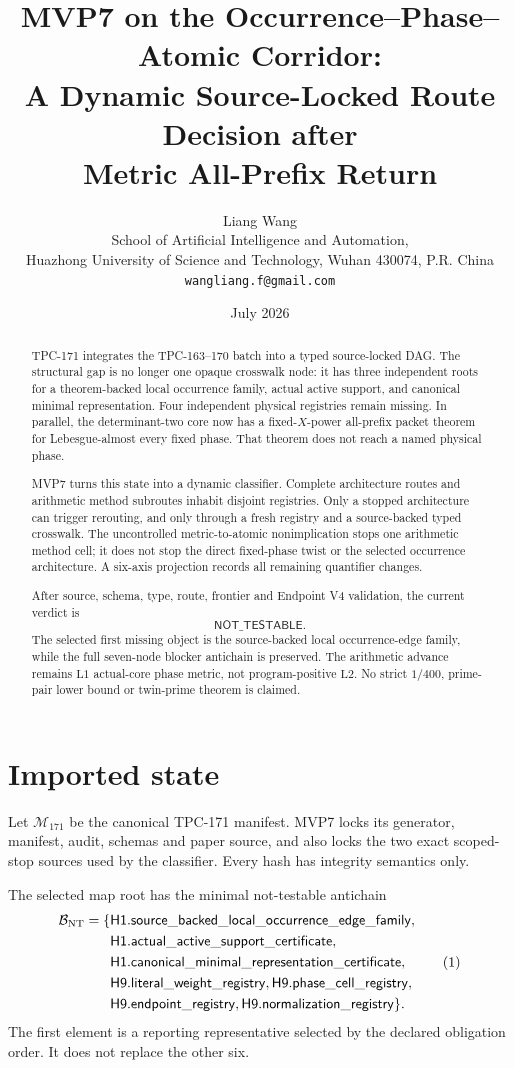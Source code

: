 \documentclass[11pt]{article}
\title{\textbf{MVP7 on the Occurrence--Phase--Atomic Corridor:}\\
\textbf{A Dynamic Source-Locked Route Decision after}\\
\textbf{Metric All-Prefix Return}}
\author{Liang Wang\\
School of Artificial Intelligence and Automation,\\
Huazhong University of Science and Technology, Wuhan 430074, P.R. China\\
\texttt{wangliang.f@gmail.com}}
\date{July 2026}
\theoremstyle{definition}
\theoremstyle{remark}
\newcommand{\Lone}{\mathrm{L1}}
\newcommand{\Ltwo}{\mathrm{L2}}
\begin{document}
\maketitle

\begin{abstract}
TPC-171 integrates the TPC-163--170 batch into a typed source-locked
DAG.  The structural gap is no longer one opaque crosswalk node: it
has three independent roots for a theorem-backed local occurrence
family, actual active support, and canonical minimal representation.
Four independent physical registries remain missing.  In parallel,
the determinant-two core now has a fixed-\(X\)-power all-prefix
packet theorem for Lebesgue-almost every fixed phase.  That theorem
does not reach a named physical phase.

MVP7 turns this state into a dynamic classifier.  Complete
architecture routes and arithmetic method subroutes inhabit disjoint
registries.  Only a stopped architecture can trigger rerouting, and
only through a fresh registry and a source-backed typed crosswalk.
The uncontrolled metric-to-atomic nonimplication stops one arithmetic
method cell; it does not stop the direct fixed-phase twist or the
selected occurrence architecture.  A six-axis projection records all
remaining quantifier changes.

After source, schema, type, route, frontier and Endpoint V4 validation,
the current verdict is
\[
 \mathsf{NOT\_TESTABLE}.
\]
The selected first missing object is the source-backed local
occurrence-edge family, while the full seven-node blocker antichain
is preserved.  The arithmetic advance remains
\(\Lone\) actual-core phase metric, not program-positive \(\Ltwo\).
No strict \(1/400\), prime-pair lower bound or twin-prime theorem is
claimed.
\end{abstract}

\section{Imported state}

Let \(\mathcal M_{171}\) be the canonical TPC-171 manifest.  MVP7
locks its generator, manifest, audit, schemas and paper source, and
also locks the two exact scoped-stop sources used by the classifier.
Every hash has integrity semantics only.

The selected map root has the minimal not-testable antichain
\[
\begin{split}
\mathcal B_{\rm NT}=\{&
\mathsf{H1.source\_backed\_local\_occurrence\_edge\_family},\\
&\mathsf{H1.actual\_active\_support\_certificate},\\
&\mathsf{H1.canonical\_minimal\_representation\_certificate},\\
&\mathsf{H9.literal\_weight\_registry},
\mathsf{H9.phase\_cell\_registry},\\
&\mathsf{H9.endpoint\_registry},
\mathsf{H9.normalization\_registry}\}.
\end{split}
\tag{1}\label{eq:blockers}
\]
The first element is a reporting representative selected by the
declared obligation order.  It does not replace the other six.
\end{document}
